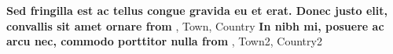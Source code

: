 %
%
%


\begin{scholarship}
					{\textbf{Sed fringilla est ac tellus congue gravida eu et erat. Donec justo elit, convallis sit amet ornare from }, Town, Country}
					{\textbf{In nibh mi, posuere ac arcu nec, commodo porttitor nulla from }, Town2, Country2}
\end{scholarship}